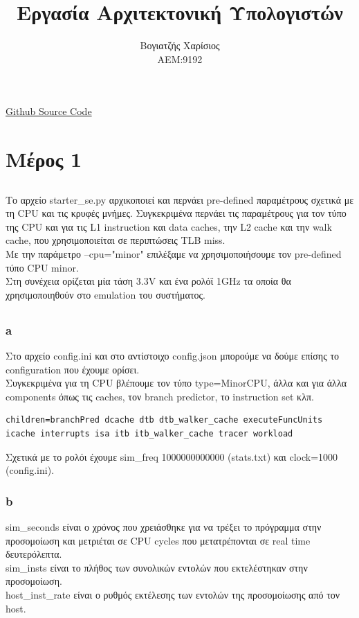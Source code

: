 \documentclass{article}
\title{Εργασία Αρχιτεκτονική Υπολογιστών}
\author{Βογιατζής Χαρίσιος \\ ΑΕΜ:9192}
\begin{document}
\maketitle

\href{https://github.com/charisvt/arch_assignment}{Github Source Code} \\

\section{Μέρος 1}
\subsection{}
Το αρχείο starter\_se.py αρχικοποιεί και περνάει pre-defined παραμέτρους σχετικά με τη CPU και τις κρυφές μνήμες. 
Συγκεκριμένα περνάει τις παραμέτρους για τον τύπο της CPU και για τις L1 instruction και data caches,  την L2 cache και την walk cache, που χρησιμοποιείται σε περιπτώσεις TLB miss. \\
Με την παράμετρο --cpu="minor" επιλέξαμε να χρησιμοποιήσουμε τον pre-defined τύπο CPU minor. \\
Στη συνέχεια ορίζεται μία τάση 3.3V και ένα ρολόϊ 1GHz τα οποία θα χρησιμοποιηθούν στο emulation του συστήματος.

\subsection{}
\subsubsection{a}
Στο αρχείο config.ini και στο αντίστοιχο config.json μπορούμε να δούμε επίσης το configuration που έχουμε ορίσει. \\
Συγκεκριμένα για τη CPU βλέπουμε τον τύπο type=MinorCPU, άλλα και για άλλα components όπως τις caches, τον branch predictor, το instruction set κλπ.
\begin{lstlisting}
children=branchPred dcache dtb dtb_walker_cache executeFuncUnits icache interrupts isa itb itb_walker_cache tracer workload
\end{lstlisting}

Σχετικά με το ρολόι έχουμε sim\_freq 1000000000000 (stats.txt) και clock=1000 (config.ini). \\

\subsubsection{b}
sim\_seconds είναι ο χρόνος που χρειάσθηκε για να τρέξει το πρόγραμμα στην προσομοίωση και μετριέται σε CPU cycles που μετατρέπονται σε real time δευτερόλεπτα. \\
sim\_insts είναι το πλήθος των συνολικών εντολών που εκτελέστηκαν στην προσομοίωση. \\
host\_inst\_rate είναι ο ρυθμός εκτέλεσης των εντολών της προσομοίωσης από τον host. \\
\end{document}

